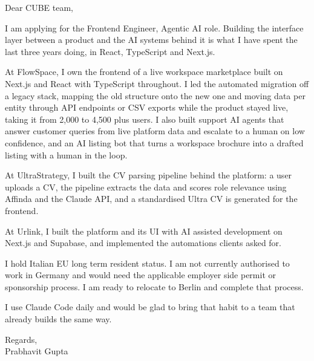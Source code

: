 \documentclass[a4paper,11pt]{article}
\begin{document}
Dear CUBE team,

I am applying for the Frontend Engineer, Agentic AI role. Building the interface layer between a product and the AI systems behind it is what I have spent the last three years doing, in React, TypeScript and Next.js.

At FlowSpace, I own the frontend of a live workspace marketplace built on Next.js and React with TypeScript throughout. I led the automated migration off a legacy stack, mapping the old structure onto the new one and moving data per entity through API endpoints or CSV exports while the product stayed live, taking it from 2,000 to 4,500 plus users. I also built support AI agents that answer customer queries from live platform data and escalate to a human on low confidence, and an AI listing bot that turns a workspace brochure into a drafted listing with a human in the loop.

At UltraStrategy, I built the CV parsing pipeline behind the platform: a user uploads a CV, the pipeline extracts the data and scores role relevance using Affinda and the Claude API, and a standardised Ultra CV is generated for the frontend.

At Urlink, I built the platform and its UI with AI assisted development on Next.js and Supabase, and implemented the automations clients asked for.

I hold Italian EU long term resident status. I am not currently authorised to work in Germany and would need the applicable employer side permit or sponsorship process. I am ready to relocate to Berlin and complete that process.

I use Claude Code daily and would be glad to bring that habit to a team that already builds the same way.

Regards,\\
Prabhavit Gupta
\end{document}
